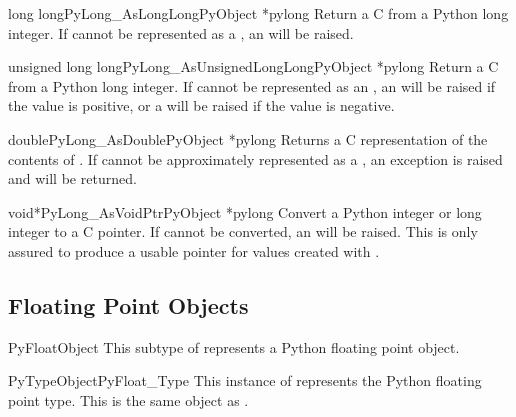 \begin{cfuncdesc}{long long}{PyLong_AsLongLong}{PyObject *pylong}
  Return a C  from a Python long integer.  If
   cannot be represented as a , an
   will be raised.
\end{cfuncdesc}

\begin{cfuncdesc}{unsigned long long}{PyLong_AsUnsignedLongLong}{PyObject
                                                                 *pylong}
  Return a C  from a Python long integer.
  If  cannot be represented as an , an  will be raised if the value is
  positive, or a  will be raised if the value is
  negative.
\end{cfuncdesc}

\begin{cfuncdesc}{double}{PyLong_AsDouble}{PyObject *pylong}
  Returns a C  representation of the contents of
  .  If  cannot be approximately represented
  as a , an  exception is
  raised and  will be returned.
\end{cfuncdesc}

\begin{cfuncdesc}{void*}{PyLong_AsVoidPtr}{PyObject *pylong}
  Convert a Python integer or long integer  to a C
   pointer.  If  cannot be converted, an
   will be raised.  This is only assured to
  produce a usable  pointer for values created with
  .
\end{cfuncdesc}


\subsection{Floating Point Objects \label{floatObjects}}

\begin{ctypedesc}{PyFloatObject}
  This subtype of  represents a Python floating point
  object.
\end{ctypedesc}

\begin{cvardesc}{PyTypeObject}{PyFloat_Type}
  This instance of  represents the Python floating
  point type.  This is the same object as .
\end{cvardesc}

